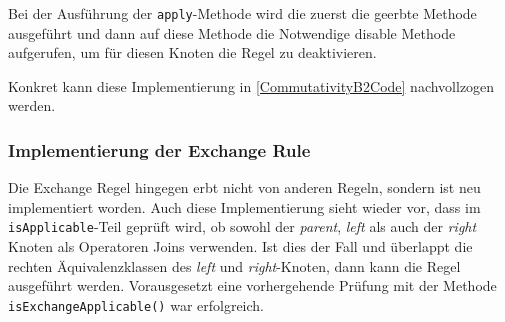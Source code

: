 Bei der Ausführung der \texttt{apply}-Methode wird die zuerst die geerbte Methode ausgeführt und dann auf diese Methode die Notwendige disable Methode aufgerufen, um für diesen Knoten die Regel zu deaktivieren.

Konkret kann diese Implementierung in \ref{CommutativityB2Code} nachvollzogen werden.




\subsubsection{Implementierung der Exchange Rule}
Die Exchange Regel hingegen erbt nicht von anderen Regeln, sondern ist neu implementiert worden. Auch diese Implementierung sieht wieder vor, dass im \texttt{is\-Applicable}-Teil geprüft wird, ob sowohl der \textit{parent}, \textit{left} als auch der \textit{right} Knoten als Operatoren Joins verwenden. Ist dies der Fall und überlappt die rechten Äquivalenzklassen des \textit{left} und \textit{right}-Knoten, dann kann die Regel ausgeführt werden. Vorausgesetzt eine vorhergehende Prüfung mit der Methode \texttt{is\-Exchange\-Applicable()} war erfolgreich. 